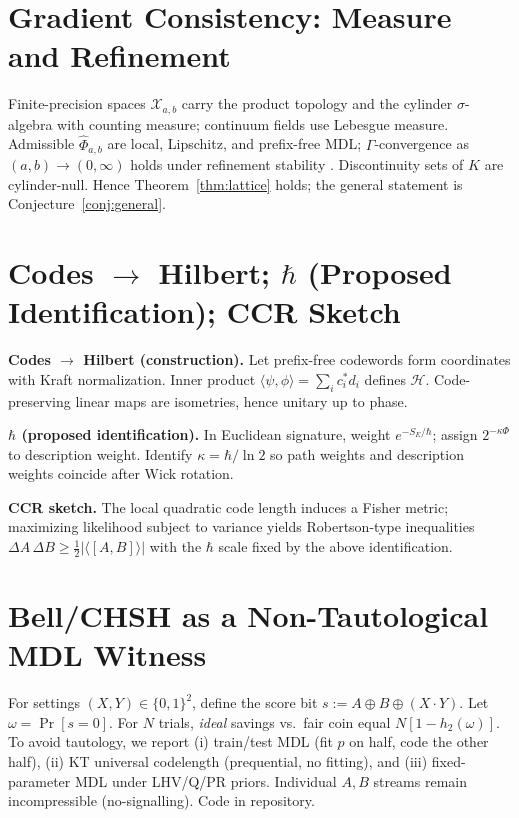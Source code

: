 \documentclass[aps,preprint,onecolumn,longbibliography,nofootinbib]{revtex4-2}
\numberwithin{equation}{section}        %
\begin{document}
\section{Gradient Consistency: Measure and Refinement}\label{app:grad}
Finite-precision spaces $\mathcal X_{a,b}$ carry the product topology and the cylinder $\sigma$-algebra with counting measure; continuum fields use Lebesgue measure. Admissible $\widehat\Phi_{a,b}$ are local, Lipschitz, and prefix-free MDL; $\Gamma$-convergence as $(a,b)\to (0,\infty)$ holds under refinement stability \cite{Braides2002}. Discontinuity sets of $K$ are cylinder-null. Hence Theorem~\ref{thm:lattice} holds; the general statement is Conjecture~\ref{conj:general}.

\section{Codes $\to$ Hilbert; $\hbar$ (Proposed Identification); CCR Sketch}\label{app:Q}
\textbf{Codes $\to$ Hilbert (construction).} Let prefix-free codewords form coordinates with Kraft normalization. Inner product $\langle \psi,\phi\rangle=\sum_i c_i^* d_i$ defines $\mathcal{H}$. Code-preserving linear maps are isometries, hence unitary up to phase.

\textbf{$\hbar$ (proposed identification).} In Euclidean signature, weight $e^{-S_E/\hbar}$; assign $2^{-\kappa \Phi}$ to description weight. Identify $\kappa=\hbar/\ln 2$ so path weights and description weights coincide after Wick rotation.

\textbf{CCR sketch.} The local quadratic code length induces a Fisher metric; maximizing likelihood subject to variance yields Robertson-type inequalities $\Delta A\,\Delta B\ge \tfrac{1}{2}|\langle[A,B]\rangle|$ with the $\hbar$ scale fixed by the above identification.

\section{Bell/CHSH as a Non-Tautological MDL Witness}\label{app:BELL}
For settings $(X,Y)\in\{0,1\}^2$, define the score bit $s:=A\oplus B\oplus (X\!\cdot\!Y)$. Let $\omega=\Pr[s=0]$. For $N$ trials, \emph{ideal} savings vs.\ fair coin equal $N[1-h_2(\omega)]$. To avoid tautology, we report (i) train/test MDL (fit $p$ on half, code the other half), (ii) KT universal codelength (prequential, no fitting), and (iii) fixed-parameter MDL under LHV/Q/PR priors. Individual $A,B$ streams remain incompressible (no-signalling). Code in repository.
\end{document}
